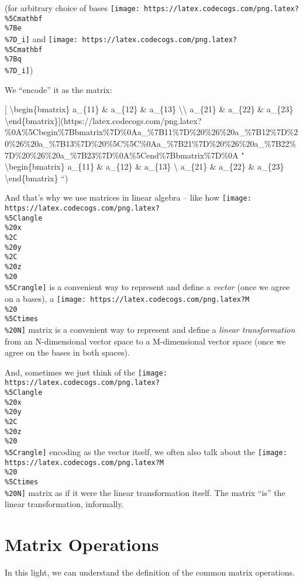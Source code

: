 \documentclass[]{article}
\begin{document}
(for arbitrary choice of bases
\texttt{[image: https://latex.codecogs.com/png.latex?\\\%5Cmathbf\\\%7Be\\\%7D\_i]} and
\texttt{[image: https://latex.codecogs.com/png.latex?\\\%5Cmathbf\\\%7Bq\\\%7D\_i]})

We ``encode'' it as the matrix:

{[} \textbackslash{}begin\{bmatrix\} a\_\{11\} \& a\_\{12\} \& a\_\{13\}
\textbackslash{}\textbackslash{} a\_\{21\} \& a\_\{22\} \& a\_\{23\}
\textbackslash{}end\{bmatrix\}{]}(https://latex.codecogs.com/png.latex?\%0A\%5Cbegin\%7Bbmatrix\%7D\%0Aa\_\%7B11\%7D\%20\%26\%20a\_\%7B12\%7D\%20\%26\%20a\_\%7B13\%7D\%20\%5C\%5C\%0Aa\_\%7B21\%7D\%20\%26\%20a\_\%7B22\%7D\%20\%26\%20a\_\%7B23\%7D\%0A\%5Cend\%7Bbmatrix\%7D\%0A
" \textbackslash{}begin\{bmatrix\} a\_\{11\} \& a\_\{12\} \& a\_\{13\}
\textbackslash{} a\_\{21\} \& a\_\{22\} \& a\_\{23\}
\textbackslash{}end\{bmatrix\} ``)

And that's why we use matrices in linear algebra -- like how
\texttt{[image: https://latex.codecogs.com/png.latex?\\\%5Clangle\\\%20x\\\%2C\\\%20y\\\%2C\\\%20z\\\%20\\\%5Crangle]}
is a convenient way to represent and define a \emph{vector} (once we agree on a
bases), a
\texttt{[image: https://latex.codecogs.com/png.latex?M\\\%20\\\%5Ctimes\\\%20N]}
matrix is a convenient way to represent and define a \emph{linear
transformation} from an N-dimensional vector space to a M-dimensional vector
space (once we agree on the bases in both spaces).

And, sometimes we just think of the
\texttt{[image: https://latex.codecogs.com/png.latex?\\\%5Clangle\\\%20x\\\%20y\\\%2C\\\%20z\\\%20\\\%5Crangle]}
encoding as the vector itself, we often also talk about the
\texttt{[image: https://latex.codecogs.com/png.latex?M\\\%20\\\%5Ctimes\\\%20N]}
matrix as if it were the linear transformation itself. The matrix ``is'' the
linear transformation, informally.

\hypertarget{matrix-operations}{%
\section{Matrix Operations}\label{matrix-operations}}

In this light, we can understand the definition of the common matrix operations.
\end{document}
